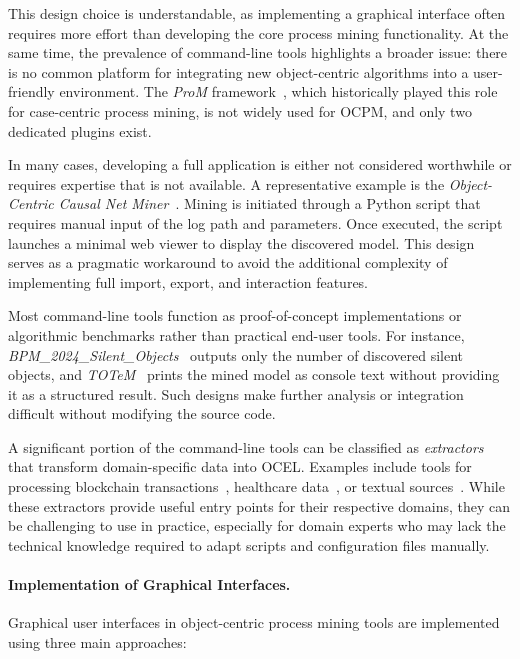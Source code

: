 This design choice is understandable, as implementing a graphical interface often requires more effort than developing the core process mining functionality. At the same time, the prevalence of command-line tools highlights a broader issue: there is no common platform for integrating new object-centric algorithms into a user-friendly environment. The \textit{ProM} framework~\cite{prom}, which historically played this role for case-centric process mining, is not widely used for OCPM, and only two dedicated plugins exist.

In many cases, developing a full application is either not considered worthwhile or requires expertise that is not available. A representative example is the \textit{Object-Centric Causal Net Miner}~\cite{occnet}. Mining is initiated through a Python script that requires manual input of the log path and parameters. Once executed, the script launches a minimal web viewer to display the discovered model. This design serves as a pragmatic workaround to avoid the additional complexity of implementing full import, export, and interaction features.

Most command-line tools function as proof-of-concept implementations or algorithmic benchmarks rather than practical end-user tools. For instance, \textit{BPM\_2024\_Silent\_Objects}~\cite{silentobjects} outputs only the number of discovered silent objects, and \textit{TOTeM}~\cite{totem} prints the mined model as console text without providing it as a structured result. Such designs make further analysis or integration difficult without modifying the source code.

A significant portion of the command-line tools can be classified as \textit{extractors} that transform domain-specific data into OCEL. Examples include tools for processing blockchain transactions~\cite{ethereum}, healthcare data~\cite{omop}, or textual sources~\cite{textmining}. While these extractors provide useful entry points for their respective domains, they can be challenging to use in practice, especially for domain experts who may lack the technical knowledge required to adapt scripts and configuration files manually.

\paragraph{Implementation of Graphical Interfaces.}

Graphical user interfaces in object-centric process mining tools are implemented using three main approaches:

